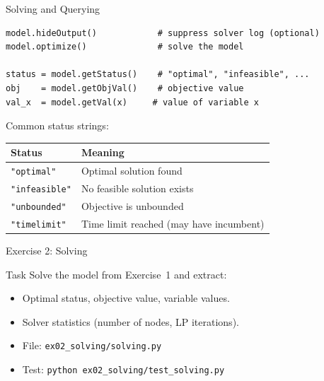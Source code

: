 \documentclass[aspectratio=169,10pt]{beamer}
\begin{document}
\begin{frame}[fragile]{Solving and Querying}
\begin{lstlisting}
model.hideOutput()            # suppress solver log (optional)
model.optimize()              # solve the model

status = model.getStatus()    # "optimal", "infeasible", ...
obj    = model.getObjVal()    # objective value
val_x  = model.getVal(x)     # value of variable x
\end{lstlisting}

\medskip
Common status strings:
\begin{table}
\centering\small
\begin{tabular}{ll}
\toprule
\textbf{Status} & \textbf{Meaning} \\
\midrule
\texttt{"optimal"}    & Optimal solution found \\
\texttt{"infeasible"} & No feasible solution exists \\
\texttt{"unbounded"}  & Objective is unbounded \\
\texttt{"timelimit"}  & Time limit reached (may have incumbent) \\
\bottomrule
\end{tabular}
\end{table}
\end{frame}

\begin{frame}{Exercise 2: Solving}
\begin{block}{Task}
Solve the model from Exercise~1 and extract:
\begin{itemize}
  \item Optimal status, objective value, variable values.
  \item Solver statistics (number of nodes, LP iterations).
\end{itemize}
\end{block}
\begin{itemize}
  \item File: \texttt{ex02\_solving/solving.py}
  \item Test: \texttt{python ex02\_solving/test\_solving.py}
\end{itemize}
\end{frame}
\end{document}
